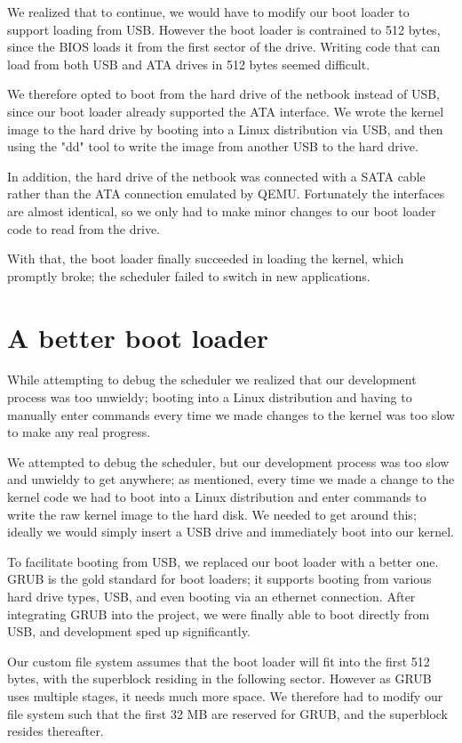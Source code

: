 \documentclass{report}
\begin{document}
We realized that to continue, we would have to modify our boot loader to
support loading from USB. However the boot loader is contrained to 512 bytes,
since the BIOS loads it from the first sector of the drive. Writing code that
can load from both USB and ATA drives in 512 bytes seemed difficult.

We therefore opted to boot from the hard drive of the netbook instead of USB,
since our boot loader already supported the ATA interface. We wrote the kernel
image to the hard drive by booting into a Linux distribution via USB, and then
using the "dd" tool to write the image from another USB to the hard drive.

In addition, the hard drive of the netbook was connected with a SATA cable
rather than the ATA connection emulated by QEMU. Fortunately the interfaces
are almost identical, so we only had to make minor changes to our boot loader
code to read from the drive.

With that, the boot loader finally succeeded in loading the kernel, which
promptly broke; the scheduler failed to switch in new applications.


\section{A better boot loader}
While attempting to debug the scheduler we realized that our development
process was too unwieldy; booting into a Linux distribution and having to
manually enter commands every time we made changes to the kernel was too slow
to make any real progress. 

We attempted to debug the scheduler, but our development process was too slow
and unwieldy to get anywhere; as mentioned, every time we made a change to the
kernel code we had to boot into a Linux distribution and enter commands to
write the raw kernel image to the hard disk. We needed to get around this;
ideally we would simply insert a USB drive and immediately boot into our
kernel. 

To facilitate booting from USB, we replaced our boot loader with a better one.
GRUB is the gold standard for boot loaders; it supports booting from various
hard drive types, USB, and even booting via an ethernet connection. After
integrating GRUB into the project, we were finally able to boot directly from
USB, and development sped up significantly.

Our custom file system assumes that the boot loader will fit into the first
512 bytes, with the superblock residing in the following sector. However as
GRUB uses multiple stages, it needs much more space. We therefore had to
modify our file system such that the first 32 MB are reserved for GRUB, and
the superblock resides thereafter.
\end{document}
